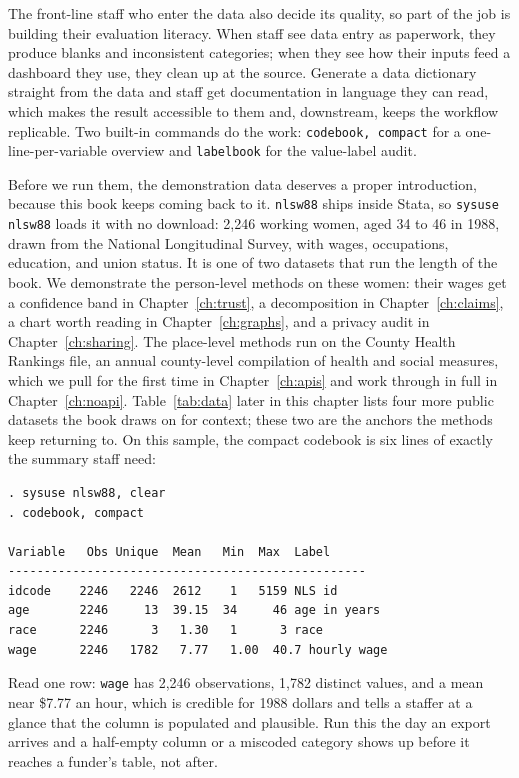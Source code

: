 \documentclass[
    a4paper,
    fontsize=10pt,
    twoside=true,
    numbers=noenddot,
]{kaobook}
\begin{document}
The front-line staff who enter the data also decide its quality, so part of the job is building their evaluation literacy. When staff see data entry as paperwork, they produce blanks and inconsistent categories; when they see how their inputs feed a dashboard they use, they clean up at the source. Generate a data dictionary straight from the data and staff get documentation in language they can read, which makes the result accessible to them and, downstream, keeps the workflow replicable. Two built-in commands do the work: \texttt{codebook, compact} for a one-line-per-variable overview and \texttt{labelbook} for the value-label audit.

Before we run them, the demonstration data deserves a proper introduction, because this book keeps coming back to it. \texttt{nlsw88} ships inside Stata, so \texttt{sysuse nlsw88} loads it with no download: 2{,}246 working women, aged 34 to 46 in 1988, drawn from the National Longitudinal Survey, with wages, occupations, education, and union status. It is one of two datasets that run the length of the book. We demonstrate the person-level methods on these women: their wages get a confidence band in Chapter~\ref{ch:trust}, a decomposition in Chapter~\ref{ch:claims}, a chart worth reading in Chapter~\ref{ch:graphs}, and a privacy audit in Chapter~\ref{ch:sharing}. The place-level methods run on the County Health Rankings file, an annual county-level compilation of health and social measures, which we pull for the first time in Chapter~\ref{ch:apis} and work through in full in Chapter~\ref{ch:noapi}. Table~\ref{tab:data} later in this chapter lists four more public datasets the book draws on for context; these two are the anchors the methods keep returning to. On this sample, the compact codebook is six lines of exactly the summary staff need:
\par
{\footnotesize
\begin{verbatim}
. sysuse nlsw88, clear
. codebook, compact

Variable   Obs Unique  Mean   Min  Max  Label
--------------------------------------------------
idcode    2246   2246  2612    1   5159 NLS id
age       2246     13  39.15  34     46 age in years
race      2246      3   1.30   1      3 race
wage      2246   1782   7.77   1.00  40.7 hourly wage
\end{verbatim}
}
Read one row: \texttt{wage} has 2{,}246 observations, 1{,}782 distinct values, and a mean near \$7.77 an hour, which is credible for 1988 dollars and tells a staffer at a glance that the column is populated and plausible. Run this the day an export arrives and a half-empty column or a miscoded category shows up before it reaches a funder's table, not after.
\end{document}
